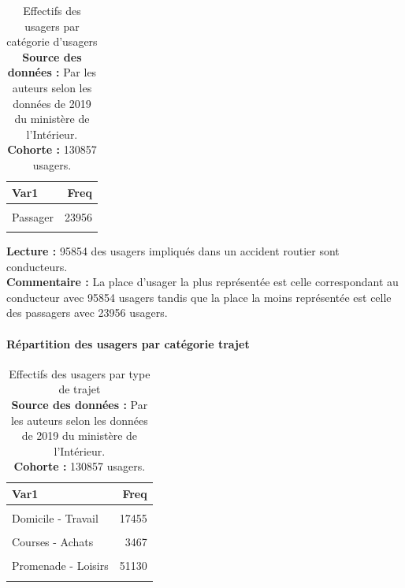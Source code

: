 \documentclass[french,]{tp}
\let\oldparagraph\paragraph
\renewcommand{\paragraph}[1]{\oldparagraph{#1}\mbox{}}
\begin{document}
\begin{table}[H]

\caption{\label{tab:tablecatu}Effectifs des usagers par catégorie d'usagers\\
\textbf{Source des données :} Par les auteurs selon les données de 2019 du ministère de l'Intérieur.\\
\textbf{Cohorte :} 130857 usagers.\\}
\centering
\begin{tabular}[t]{lr}
\toprule
\textbf{Var1} & \textbf{Freq}\\
\midrule
\cellcolor{gray!6}{Conducteur} & \cellcolor{gray!6}{95854}\\
Passager & 23956\\
\cellcolor{gray!6}{Piéton} & \cellcolor{gray!6}{11047}\\
\bottomrule
\end{tabular}
\end{table}

\textbf{Lecture :} 95854 des usagers impliqués dans un accident routier sont conducteurs.\\
\textbf{Commentaire :} La place d'usager la plus représentée est celle correspondant au conducteur avec 95854 usagers tandis que la place la moins représentée est celle des passagers avec 23956 usagers.

\newpage

\hypertarget{ruxe9partition-des-usagers-par-catuxe9gorie-trajet}{%
\paragraph{Répartition des usagers par catégorie trajet}\label{ruxe9partition-des-usagers-par-catuxe9gorie-trajet}}





\begin{table}[H]

\caption{\label{tab:tabletrajet}Effectifs des usagers par type de trajet\\
\textbf{Source des données :} Par les auteurs selon les données de 2019 du ministère de l'Intérieur.\\
\textbf{Cohorte :} 130857 usagers.\\}
\centering
\begin{tabular}[t]{lr}
\toprule
\textbf{Var1} & \textbf{Freq}\\
\midrule
\cellcolor{gray!6}{Non renseigné} & \cellcolor{gray!6}{34322}\\
Domicile - Travail & 17455\\
\cellcolor{gray!6}{Domicile - École} & \cellcolor{gray!6}{2796}\\
Courses - Achats & 3467\\
\cellcolor{gray!6}{Utilisation professionnnelle} & \cellcolor{gray!6}{12359}\\
\addlinespace
Promenade - Loisirs & 51130\\
\cellcolor{gray!6}{Autre} & \cellcolor{gray!6}{9328}\\
\bottomrule
\end{tabular}
\end{table}
\end{document}
